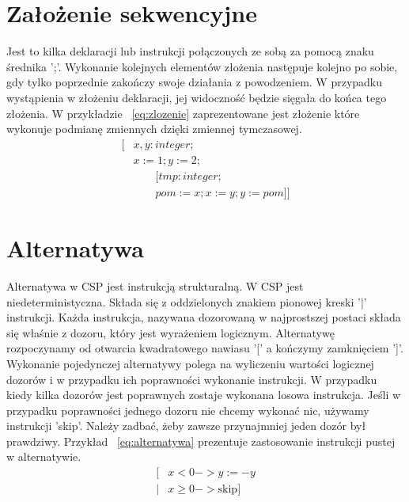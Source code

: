\documentclass[a4paper]{report}
\begin{document}
  \section{Założenie sekwencyjne}
  Jest to kilka deklaracji lub instrukcji połączonych ze sobą za pomocą znaku średnika ';'.
  Wykonanie kolejnych elementów złożenia następuje kolejno po sobie, gdy tylko poprzednie zakończy swoje działania z powodzeniem.
  W przypadku wystąpienia w złożeniu deklaracji, jej widoczność będzie sięgała do końca tego złożenia.
  W przykładzie ~\ref{eq:zlozenie} zaprezentowane jest złożenie które wykonuje podmianę zmiennych dzięki zmiennej tymczasowej.
  \begin{equation}
    \label{eq:zlozenie}
    \begin{split}
      \lbrack & x, y: integer;\\
      & x := 1; y := 2;\\
      & \qquad \lbrack tmp: integer;\\
      & \qquad pom := x; x := y; y := pom \rbrack \rbrack
    \end{split}
  \end{equation}

  \section{Alternatywa}
  Alternatywa w CSP jest instrukcją strukturalną.
  W CSP jest niedeterministyczna.
  Składa się z oddzielonych znakiem pionowej kreski '|' instrukcji.
  Każda instrukcja, nazywana dozorowaną w najprostszej postaci składa się właśnie z dozoru, który jest wyrażeniem logicznym.
  Alternatywę rozpoczynamy od otwarcia kwadratowego nawiasu '[' a kończymy zamknięciem ']'.
  Wykonanie pojedynczej alternatywy polega na wyliczeniu wartości logicznej dozorów i w przypadku ich poprawności wykonanie instrukcji.
  W przypadku kiedy kilka dozorów jest poprawnych zostaje wykonana losowa instrukcja.
  Jeśli w przypadku poprawności jednego dozoru nie chcemy wykonać nic, używamy instrukcji 'skip'.
  Należy zadbać, żeby zawsze przynajmniej jeden dozór był prawdziwy.
  Przykład ~\ref{eq:alternatywa} prezentuje zastosowanie instrukcji pustej w alternatywie.
  \begin{equation}
    \label{eq:alternatywa}
    \begin{split}
      \lbrack & x < 0 -> y := -y \\
      | & x \geq0 -> \text{skip} \rbrack
    \end{split}
  \end{equation}
\end{document}
